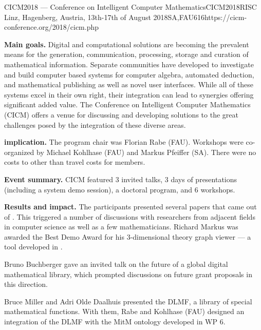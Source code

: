 \begin{event}{CICM2018 --- Conference on Intelligent Computer Mathematics}{CICM2018}{RISC Linz, Hagenberg, Austria, 13th-17th of August 2018}{SA,FAU}{61}{6}{https://cicm-conference.org/2018/cicm.php}

\textbf{Main goals.}
Digital and computational solutions are becoming the prevalent means for the generation, communication, processing, storage and curation of mathematical information.
Separate communities have developed to investigate and build computer based systems for computer algebra, automated deduction, and mathematical publishing as well as novel user interfaces.
While all of these systems excel in their own right, their integration can lead to synergies offering significant added value.
The Conference on Intelligent Computer Mathematics (CICM) offers a venue for discussing and developing solutions to the great challenges posed by the integration of these diverse areas.

\textbf{\ODK implication.}
The program chair was Florian Rabe (FAU).
Workshops were co-organized by Michael Kohlhase (FAU) and Markus Pfeiffer (SA).
There were no costs to \ODK other than travel costs for \ODK members.

\textbf{Event summary.}
CICM featured 3 invited talks, 3 days of presentations (including a system demo session), a doctoral program, and 6 workshops.

\textbf{Results and impact.}
The \ODK participants presented several papers that came out of \ODK.
This triggered a number of discussions with researchers from adjacent fields in computer science as well as a few mathematicians.
Richard Markus was awarded the Best Demo Award for his 3-dimensional theory graph viewer --- a tool developed in \ODK.

Bruno Buchberger gave an invited talk on the future of a global digital mathematical library, which prompted discussions on future grant proposals in this direction.

Bruce Miller and Adri Olde Daalhuis presented the DLMF, a library of special mathematical functions.
With them, Rabe and Kohlhase (FAU) designed an integration of the DLMF with the MitM ontology developed in \ODK WP 6.

\end{event}
